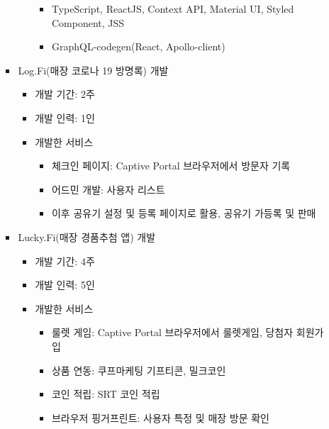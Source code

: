 \begin{itemize}[label=]
\begin{itemize}[label=]
\begin{itemize}[label=]
\begin{itemize}[label=]
			                  \begin{itemize}
				                  \item TypeScript, ReactJS, Context API, Material UI, Styled Component, JSS
				                  \item GraphQL-codegen(React, Apollo-client)
			                  \end{itemize}
		            \end{itemize}
		      \item Log.Fi(매장 코로나 19 방명록) 개발 \hyperref[logfi]{\space {}}
		            \begin{itemize}[label=]
			            \item 개발 기간: 2주
			            \item 개발 인력: 1인
			            \item 개발한 서비스
			                  \begin{itemize}
				                  \item 체크인 페이지: Captive Portal 브라우저에서 방문자 기록
				                  \item 어드민 개발: 사용자 리스트
				                  \item 이후 공유기 설정 및 등록 페이지로 활용, 공유기 가등록 및 판매
			                  \end{itemize}
		            \end{itemize}
		      \item Lucky.Fi(매장 경품추첨 앱) 개발 \hyperref[luckyfi]{\space {}}
		            \begin{itemize}[label=]
			            \item 개발 기간: 4주
			            \item 개발 인력: 5인
			            \item 개발한 서비스
			                  \begin{itemize}
				                  \item 룰렛 게임: Captive Portal 브라우저에서 룰렛게임, 당첨자 회원가입
				                  \item 상품 연동: 쿠프마케팅 기프티콘, 밀크코인
				                  \item 코인 적립: SRT 코인 적립
				                  \item 브라우저 핑거프린트: 사용자 특정 및 매장 방문 확인
			                  \end{itemize}
		            \end{itemize}

\end{itemize}
\end{itemize}
\end{itemize}
